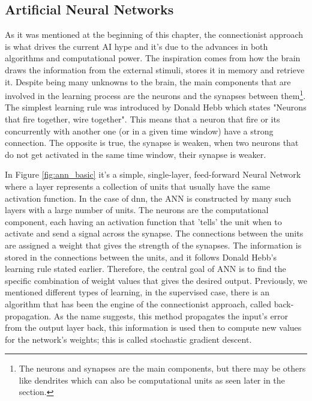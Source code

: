 \subsection{Artificial Neural Networks} \label{s:ann_overview}

As it was mentioned at the beginning of this chapter, the connectionist approach is what drives the current AI hype and it's due to the advances in both algorithms and computational power. The inspiration comes from how the brain draws the information from the external stimuli, stores it in memory and retrieve it. Despite being many unknowns to the brain, the main components that are involved in the learning process are the neurons and the synapses between them\footnote{The neurons and synapses are the main components, but there may be others like dendrites which can also be computational units as seen later in the section.}. The simplest learning rule was introduced by Donald Hebb which states "Neurons that fire together, wire together"\cite{Hebb_Donald1949-nn}. This means that a neuron that fire or its concurrently with another one (or in a given time window) have a strong connection. The opposite is true, the synapse is weaken, when two neurons that do not get activated in the same time window, their synapse is weaker.


In Figure \ref{fig:ann_basic} it's a simple, single-layer, feed-forward Neural Network where a layer represents a collection of units that usually have the same activation function. In the case of \acrfull{dnn}, the ANN is constructed by many such layers with a large number of units. The neurons are the computational component, each having an activation function that 'tells' the unit when to activate and send a signal across the synapse. The connections between the units are assigned a weight that gives the strength of the synapses. The information is stored in the connections between the units, and it follows Donald Hebb's learning rule stated earlier. Therefore, the central goal of ANN is to find the specific combination of weight values that gives the desired output. Previously, we mentioned different types of learning, in the supervised case, there is an algorithm that has been the engine of the connectionist approach, called back-propagation. As the name suggests, this method propagates the input's error from the output layer back, this information is used then to compute new values for the network's weights; this is called stochastic gradient descent.

